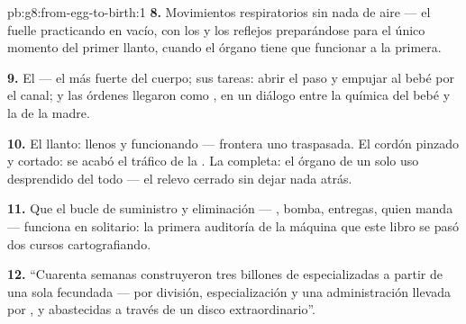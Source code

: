 \begin{solution}{pb:g8:from-egg-to-birth:1}
\textbf{8.} Movimientos respiratorios sin nada de aire --- el fuelle
practicando en vacío, con los  y los reflejos preparándose para
el único momento del primer llanto, cuando el órgano tiene que
funcionar a la primera.

\textbf{9.} El  --- el  más fuerte del cuerpo; sus tareas:
abrir el paso y empujar al bebé por el canal; y las órdenes llegaron
como , en un diálogo entre la química del bebé y la de la madre.

\textbf{10.} El llanto:  llenos y funcionando --- frontera uno
traspasada. El cordón pinzado y cortado: se acabó el tráfico de la
. La  completa: el órgano de un solo uso desprendido
del todo --- el relevo cerrado sin dejar nada atrás.

\textbf{11.} Que el bucle de suministro y eliminación --- ,
bomba, entregas, quien manda --- funciona en solitario: la primera
auditoría de la máquina que este libro se pasó dos cursos
cartografiando.

\textbf{12.} ``Cuarenta semanas construyeron tres billones de 
especializadas a partir de una sola   fecundada --- por
división, especialización y una administración llevada por , y
abastecidas a través de un disco extraordinario''.
\end{solution}
